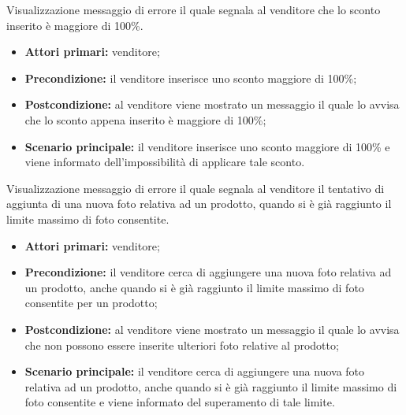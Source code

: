 \label{estensione:sconto-maggiore-cento}

Visualizzazione messaggio di errore il quale segnala al venditore che lo sconto inserito è maggiore di 100\%.
\begin{itemize}
    \item \textbf{Attori primari:} venditore;
    \item \textbf{Precondizione:} il venditore inserisce uno sconto maggiore di 100\%;
    \item \textbf{Postcondizione:} al venditore viene mostrato un messaggio il quale lo avvisa che lo sconto appena inserito è maggiore di 100\%;
    \item \textbf{Scenario principale:} il venditore inserisce uno sconto maggiore di 100\% e viene informato dell'impossibilità di applicare tale sconto.
\end{itemize}

\label{estensione:limite-foto-raggiunto}

Visualizzazione messaggio di errore il quale segnala al venditore il tentativo di aggiunta di una nuova foto relativa ad un prodotto, quando si è già raggiunto il limite massimo di foto consentite.
\begin{itemize}
    \item \textbf{Attori primari:} venditore;
    \item \textbf{Precondizione:} il venditore cerca di aggiungere una nuova foto relativa ad un prodotto, anche quando si è già raggiunto il limite massimo di foto consentite per un prodotto;
    \item \textbf{Postcondizione:} al venditore viene mostrato un messaggio il quale lo avvisa che non possono essere inserite ulteriori foto relative al prodotto;
    \item \textbf{Scenario principale:} il venditore cerca di aggiungere una nuova foto relativa ad un prodotto, anche quando si è già raggiunto il limite massimo di foto consentite e viene informato del superamento di tale limite.
\end{itemize}

\label{estensione:nessuna-foto-inserita}

